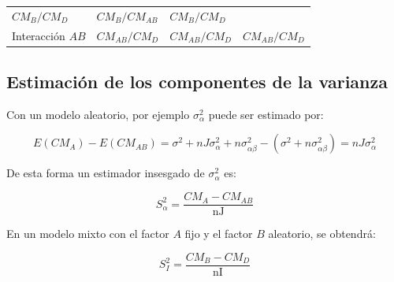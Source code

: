 \documentclass[]{book}
\theoremstyle{definition}
\theoremstyle{definition}
\theoremstyle{definition}
\theoremstyle{remark}
\begin{document}
\begin{longtable}[]{@{}llll@{}}
\begin{minipage}[t]{0.17\columnwidth}
\(CM_{B}/CM_{D}\)\strut
\end{minipage} & \begin{minipage}[t]{0.23\columnwidth}\raggedright
\(CM_{B}/CM_{AB}\)\strut
\end{minipage} & \begin{minipage}[t]{0.23\columnwidth}\raggedright
\(CM_{B}/CM_{D}\)\strut
\end{minipage}\tabularnewline
\begin{minipage}[t]{0.26\columnwidth}\raggedright
Interacción \(AB\)\strut
\end{minipage} & \begin{minipage}[t]{0.17\columnwidth}\raggedright
\(CM_{AB}/CM_{D}\)\strut
\end{minipage} & \begin{minipage}[t]{0.23\columnwidth}\raggedright
\(CM_{AB}/CM_{D}\)\strut
\end{minipage} & \begin{minipage}[t]{0.23\columnwidth}\raggedright
\(CM_{AB}/CM_{D}\)\strut
\end{minipage}\tabularnewline
\bottomrule
\end{longtable}

\hypertarget{estimacion-de-los-componentes-de-la-varianza}{%
\subsection{Estimación de los componentes de la
varianza}\label{estimacion-de-los-componentes-de-la-varianza}}

Con un modelo aleatorio, por ejemplo \(\sigma_{\alpha}^{2}\) puede ser
estimado por:

\[
E\left( CM_{A} \right) - E\left( CM_{AB} \right) = \sigma^{2} + nJ\sigma_{\alpha}^{2} + n\sigma_{\alpha\beta}^{2} - \left( \sigma^{2} + n\sigma_{\alpha\beta}^{2} \right) = nJ\sigma_{\alpha}^{2}
\]

De esta forma un estimador insesgado de \(\sigma_{\alpha}^{2}\) es:

\[
S_{\alpha}^{2} = \frac{CM_{A} - CM_{AB}}{\text{nJ}}
\]

En un modelo mixto con el factor \(A\) fijo y el factor \(B\) aleatorio,
se obtendrá:

\[
S_{I}^{2} = \frac{CM_{B} - CM_{D}}{\text{nI}}
\]
\end{document}
